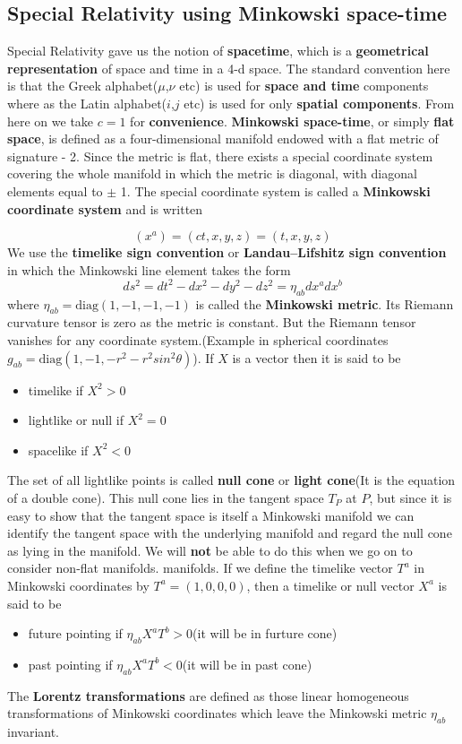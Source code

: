 \documentclass[12pt,a4paper]{article}
\numberwithin{table}{section}
\numberwithin{figure}{section}
\numberwithin{equation}{section}
\theoremstyle{remark}
\theoremstyle{definition}
\begin{document}
\subsection{Special Relativity using Minkowski space-time}
Special Relativity gave us the notion of \textbf{spacetime}, which is a \textbf{geometrical representation} of space and time in a 4-d space.
The standard convention here is that the Greek alphabet($\mu$,$\nu$ etc) is used for \textbf{space and time} components where as the Latin alphabet($i$,$j$ etc) is used for only \textbf{spatial components}. From here on we take $c=1$ for \textbf{convenience}.
\textbf{Minkowski space-time}, or simply \textbf{flat space}, is defined as a  
four-dimensional manifold endowed with a flat metric of signature - 2. Since the metric is flat, there exists a special coordinate system covering the whole manifold in which the metric is diagonal, with diagonal elements equal to $\pm$ 1. The special coordinate system is called a 
\textbf{Minkowski coordinate system} and is written 

\begin{equation}
    (x^a)=(ct,x,y,z)=(t,x,y,z)
\end{equation}
We use the \textbf{timelike sign convention} or \textbf{Landau–Lifshitz sign convention} in which the Minkowski line element takes the form
\begin{equation}
ds^2=dt^2-dx^2-dy^2-dz^2=\eta_{ab}dx^adx^b
\end{equation}
where $\eta_{ab}=\text{diag}(1,-1,-1,-1)$ is called the \textbf{Minkowski metric}. Its Riemann curvature tensor is zero as the metric is constant. But the Riemann tensor vanishes for any coordinate system.(Example in spherical coordinates $g_{ab}=\text{diag}(1,-1,-r^2-r^2sin^2\theta)$).
If $X$ is a vector then it is said to be
\begin{itemize}
    \item timelike if $X^2>0$
    \item lightlike or null if $X^2=0$
    \item spacelike if $X^2<0$
\end{itemize}
The set of all lightlike points is called \textbf{null cone} or \textbf{light cone}(It is the equation of a double cone). This null cone lies in the tangent space $T_P$ at $P$, but since it is easy to show that the tangent space is itself a Minkowski manifold we can identify the tangent space with the 
underlying manifold and regard the null cone as lying in the manifold. We 
will \textbf{not} be able to do this when we go on to consider non-flat manifolds. manifolds. If we define the timelike vector $T^a$ in Minkowski coordinates by  $T^a = (1, 0, 0, 0)$, then a timelike or null vector $X^a$ is said to be
\begin{itemize}
    \item future pointing  if $\eta_{ab}X^aT^b>0$(it will be in furture cone)
    \item past pointing  if $\eta_{ab}X^aT^b<0$(it will be in past cone)
\end{itemize}
The \textbf{Lorentz transformations} are defined as those linear homogeneous  
transformations of Minkowski coordinates which leave the Minkowski metric $\eta_{ab}$ invariant.
\end{document}
